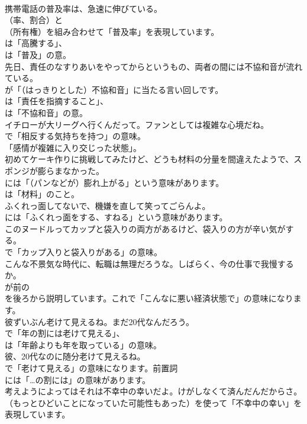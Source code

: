 \documentclass[8pt]{extreport}
\begin{document}
\begin{CJK}{UTF8}{min}
\\	携帯電話の普及率は、急速に伸びている。 
\\	（率、割合）と 
\\	（所有権）を組み合わせて「普及率」を表現しています。
\\	は「高騰する」、
\\	は「普及」の意。	
\\	先日、責任のなすりあいをやってからというもの、両者の間には不協和音が流れている。 
\\	が「（はっきりとした）不協和音」に当たる言い回しです。
\\	は「責任を指摘すること」、
\\	は「不協和音」の意。	
\\	イチローが大リーグへ行くんだって。ファンとしては複雑な心境だね。 
\\	で「相反する気持ちを持つ」の意味。
\\	「感情が複雑に入り交じった状態」。	
\\	初めてケーキ作りに挑戦してみたけど、どうも材料の分量を間違えたようで、スポンジが膨らまなかった。 
\\	には「（パンなどが）膨れ上がる」という意味があります。
\\	は「材料」のこと。	
\\	ふくれっ面してないで、機嫌を直して笑ってごらんよ。 
\\	には「ふくれっ面をする、すねる」という意味があります。	
\\	このヌードルってカップと袋入りの両方があるけど、袋入りの方が辛い気がする。 
\\	で「カップ入りと袋入りがある」の意味。	
\\	こんな不景気な時代に、転職は無理だろうな。しばらく、今の仕事で我慢するか。 
\\	が前の
\\	を後ろから説明しています。これで「こんなに悪い経済状態で」の意味になります。	
\\	彼ずいぶん老けて見えるね。まだ20代なんだろう。 
\\	で「年の割には老けて見える」、
\\	は「年齢よりも年を取っている」の意味。	
\\	彼、20代なのに随分老けて見えるね。 
\\	で「老けて見える」の意味になります。前置詞
\\	には「…の割には」の意味があります。	
\\	考えようによってはそれは不幸中の幸いだよ。けがしなくて済んだんだからさ。 
\\	（もっとひどいことになっていた可能性もあった）を使って「不幸中の幸い」を表現しています。

\end{CJK}
\end{document}
